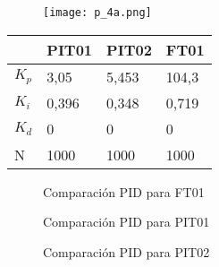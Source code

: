 {\begin{figure}[h!]
	\centering
	\texttt{[image: p\_4a.png]}
	\label{fig:LCs}
\end{figure}

\begin{comment}
Se observa que algunos de los controladores PID son del tipo proporcional integrador, dando así ya que la ganancia en los diferentes escalones en la planta no era constante. Al utilizar un PI genera una salida con error de estado estacionario cero. 
\end{comment}

\begin{table}[h]
	\centering
	\begin{tabular}{|l|l|l|l|}
		\hline
		& PIT01 & PIT02 & FT01 \\ \hline
		$K_p$ & 3,05 & 5,453 & 104,3 \\ \hline
		$K_i$ & 0,396 & 0,348 & 0,719 \\ \hline
		$K_d$ & 0 & 0 & 0 \\ \hline
		N & 1000 & 1000 & 1000 \\ \hline
	\end{tabular}
	\label{tab:pid}
\end{table}

\begin{comment}
	C:\Users\glori\Desktop\DANIELA\VISUAL_DANI\Automa\MATLAB\22-05\Comparacion PID y PLANTAS\FT01
	Respuesta_Strenj
\end{comment}






\begin{figure}[htbp]
	\centering
\hspace{-4mm}
	\caption{Comparación PID para FT01} \label{fig:FT1}
\end{figure}

\begin{figure}[htbp]
	\centering
\hspace{-4mm}
	\caption{Comparación PID para PIT01} \label{fig:PIT1}
\end{figure}

\begin{figure}[htbp]
	\centering
	\hspace{-4mm}
	\caption{Comparación PID para PIT02} \label{fig:PIT2}
\end{figure}


}
